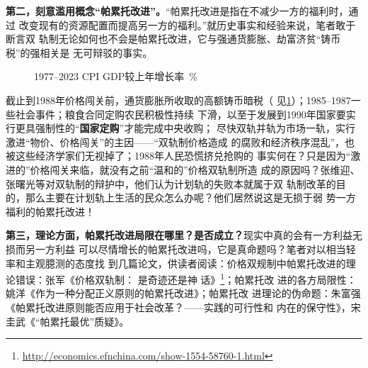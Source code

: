 \textbf{第二，刻意滥用概念“帕累托改进”。}“帕累托改进是指在不减少一方的福利时，通过
改变现有的资源配置而提高另一方的福利。”就历史事实和经验来说，笔者敢于断言双
轨制无论如何也不会是帕累托改进，它与强通货膨胀、劫富济贫“铸币税”的强相关是
无可辩驳的事实。

\begin{figure}[ht]
  \centering


  \caption{\label{fig:tongpeng30}1977--2023 CPI GDP较上年增长率\ \% }
\end{figure}

截止到1988年价格闯关前，通货膨胀所收取的高额铸币暗税（
见\cref{fig:tongpeng30}）；1985--1987一些社会事件；粮食合同定购农民积极性持续
下滑，以至于发展到1990年国家要实行更具强制性的“\textbf{国家定购}”才能完成中央收购；
尽快双轨并轨为市场一轨，实行激进“物价、价格闯关”的主因——“双轨制价格造成
的腐败和经济秩序混乱”，也被这些经济学家们无视掉了；1988年人民恐慌挤兑抢购的
事实何在？只是因为“激进的”价格闯关来临，就没有之前“温和的”价格双轨制所造
成的原因吗？张维迎、张曙光等对双轨制的辩护中，他们认为计划轨的失败本就属于双
轨制改革的目的，那么主要在计划轨上生活的民众怎么办呢？他们居然说这是无损于弱
势一方福利的帕累托改进！

\textbf{第三，理论方面，帕累托改进局限在哪里？是否成立？}现实中真的会有一方利益无损而另一方利益
可以尽情增长的帕累托改进吗，它是真命题吗？笔者对以相当轻率和主观臆测的态度找
到几篇论文，供读者阅读：价格双规制中帕累托改进的理论错误：张军《价格双轨制：
是奇迹还是神
话》\footnote{\url{http://economics.efnchina.com/show-1554-58760-1.html}}；帕累托改
进的各方局限性：姚洋《作为一种分配正义原则的帕累托改进》\cite{yaoyang}；帕累托改
进理论的伪命题：朱富强《帕累托改进原则能否应用于社会改革？——实践的可行性和
内在的保守性》\cite{zhufuqiang}，宋圭武《“帕累托最优”质疑》\cite{songguiwu}。

